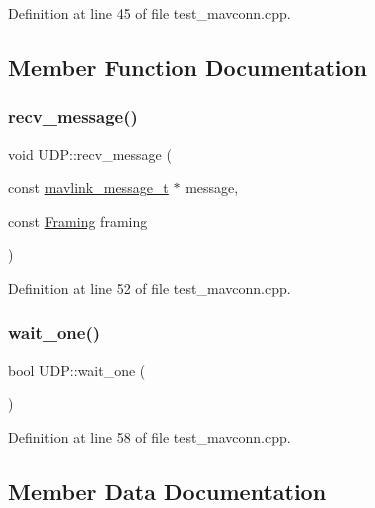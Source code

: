 Definition at line 45 of file test\+\_\+mavconn.\+cpp.



\subsection{Member Function Documentation}
\mbox{\label{classUDP_abb13c71155609dc75f7157d4f23b8dcf}} 
\subsubsection{\texorpdfstring{recv\_message()}{recv\_message()}}
{\footnotesize\ttfamily void U\+D\+P\+::recv\+\_\+message (\begin{DoxyParamCaption}\item[{const \mbox{\hyperlink{include__v0_89_2mavlink__types_8h_a63b963764c09dc72f4910c1521e325b9}{mavlink\+\_\+message\+\_\+t}} $\ast$}]{message,  }\item[{const \mbox{\hyperlink{group__mavconn_gac93e6f8262bcc6008b4882ae6213f494}{Framing}}}]{framing }\end{DoxyParamCaption})\hspace{0.3cm}{\ttfamily [inline]}}



Definition at line 52 of file test\+\_\+mavconn.\+cpp.

\mbox{\label{classUDP_a350638d58a516efbe6dd3c8dac543e0d}} 
\subsubsection{\texorpdfstring{wait\_one()}{wait\_one()}}
{\footnotesize\ttfamily bool U\+D\+P\+::wait\+\_\+one (\begin{DoxyParamCaption}{ }\end{DoxyParamCaption})\hspace{0.3cm}{\ttfamily [inline]}}



Definition at line 58 of file test\+\_\+mavconn.\+cpp.



\subsection{Member Data Documentation}
\mbox{\label{classUDP_a0e359be3d5794345f991db733f8b7cac}} 
